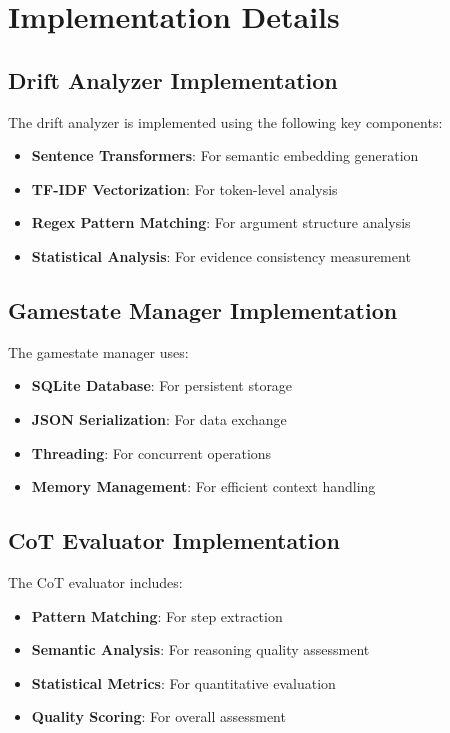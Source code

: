\documentclass[11pt]{article}
\begin{document}



\appendix

\section{Implementation Details}

\subsection{Drift Analyzer Implementation}

The drift analyzer is implemented using the following key components:

\begin{itemize}
    \item \textbf{Sentence Transformers}: For semantic embedding generation
    \item \textbf{TF-IDF Vectorization}: For token-level analysis
    \item \textbf{Regex Pattern Matching}: For argument structure analysis
    \item \textbf{Statistical Analysis}: For evidence consistency measurement
\end{itemize}

\subsection{Gamestate Manager Implementation}

The gamestate manager uses:

\begin{itemize}
    \item \textbf{SQLite Database}: For persistent storage
    \item \textbf{JSON Serialization}: For data exchange
    \item \textbf{Threading}: For concurrent operations
    \item \textbf{Memory Management}: For efficient context handling
\end{itemize}

\subsection{CoT Evaluator Implementation}

The CoT evaluator includes:

\begin{itemize}
    \item \textbf{Pattern Matching}: For step extraction
    \item \textbf{Semantic Analysis}: For reasoning quality assessment
    \item \textbf{Statistical Metrics}: For quantitative evaluation
    \item \textbf{Quality Scoring}: For overall assessment
\end{itemize}
\end{document}
